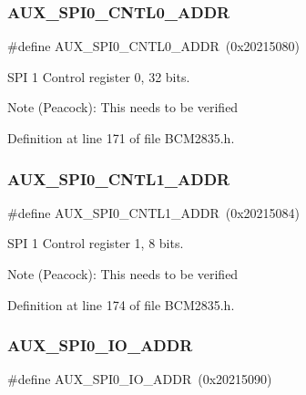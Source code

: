 \subsubsection{\texorpdfstring{A\+U\+X\+\_\+\+S\+P\+I0\+\_\+\+C\+N\+T\+L0\+\_\+\+A\+D\+DR}{AUX\_SPI0\_CNTL0\_ADDR}}
{\footnotesize\ttfamily \#define A\+U\+X\+\_\+\+S\+P\+I0\+\_\+\+C\+N\+T\+L0\+\_\+\+A\+D\+DR~(0x20215080)}



S\+PI 1 Control register 0, 32 bits. 

\begin{DoxyNote}{Note}
(Peacock)\+: This needs to be verified 
\end{DoxyNote}


Definition at line 171 of file B\+C\+M2835.\+h.

\mbox{\label{group__SPI_gaa4cdf59ae699e8e598ac84dc6f98e65e}} 
\subsubsection{\texorpdfstring{A\+U\+X\+\_\+\+S\+P\+I0\+\_\+\+C\+N\+T\+L1\+\_\+\+A\+D\+DR}{AUX\_SPI0\_CNTL1\_ADDR}}
{\footnotesize\ttfamily \#define A\+U\+X\+\_\+\+S\+P\+I0\+\_\+\+C\+N\+T\+L1\+\_\+\+A\+D\+DR~(0x20215084)}



S\+PI 1 Control register 1, 8 bits. 

\begin{DoxyNote}{Note}
(Peacock)\+: This needs to be verified 
\end{DoxyNote}


Definition at line 174 of file B\+C\+M2835.\+h.

\mbox{\label{group__SPI_ga9ffd1ea2cfa82c89ef664ce216453987}} 
\subsubsection{\texorpdfstring{A\+U\+X\+\_\+\+S\+P\+I0\+\_\+\+I\+O\+\_\+\+A\+D\+DR}{AUX\_SPI0\_IO\_ADDR}}
{\footnotesize\ttfamily \#define A\+U\+X\+\_\+\+S\+P\+I0\+\_\+\+I\+O\+\_\+\+A\+D\+DR~(0x20215090)}



